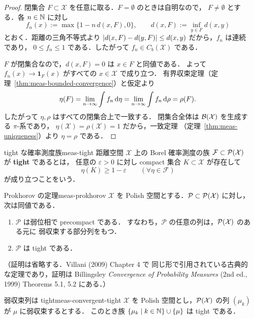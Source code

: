 \begin{proof}
  閉集合 $F\subset \mathcal{X}$ を任意に取る．$F=\emptyset$ のときは自明なので，
  $F\neq\emptyset$ とする．各 $n\in\mathbb{N}$ に対し
  \[
    f_n(x):=\max\{1-n\,d(x,F),0\},
    \qquad
    d(x,F):=\inf_{y\in F}d(x,y)
  \]
  とおく．距離の三角不等式より
  $\lvert d(x,F)-d(y,F) \rvert\leq d(x,y)$ だから，$f_n$ は連続であり，
  $0\leq f_n\leq1$ である．したがって $f_n\in C_b(\mathcal{X})$ である．

  $F$ が閉集合なので，$d(x,F)=0$ は $x\in F$ と同値である．
  よって $f_n(x)\to\mathbf{1}_F(x)$ がすべての $x\in \mathcal{X}$ で成り立つ．
  有界収束定理（定理~\ref{thm:meas-bounded-convergence}）と仮定より
  \[
    \eta(F)=\lim_{n\to\infty}\int f_n\,\mathrm{d}\eta
    =\lim_{n\to\infty}\int f_n\,\mathrm{d}\rho
    =\rho(F).
  \]
  したがって $\eta,\rho$ はすべての閉集合上で一致する．
  閉集合全体は $\mathcal{B}(\mathcal{X})$ を生成する $\pi$-系であり，
  $\eta(\mathcal{X})=\rho(\mathcal{X})=1$ だから，一致定理
  （定理~\ref{thm:meas-uniqueness}）より $\eta=\rho$ である．
\end{proof}

\begin{definition}{tight な確率測度族}{meas-tight}
  距離空間 $\mathcal{X}$ 上の Borel 確率測度の族
  $\mathcal{F}\subset\mathcal{P}(\mathcal{X})$ が \textbf{tight} であるとは，
  任意の $\varepsilon>0$ に対し compact 集合 $K\subset \mathcal{X}$ が存在して
  \[
    \eta(K)\geq 1-\varepsilon
    \qquad(\forall\eta\in\mathcal{F})
  \]
  が成り立つことをいう．
\end{definition}

\begin{theorem}{Prokhorov の定理}{meas-prokhorov}
  $\mathcal{X}$ を Polish 空間とする．$\mathcal{P}\subset\mathcal{P}(\mathcal{X})$ に対し，
  次は同値である．
  \begin{enumerate}
    \item $\mathcal{P}$ は弱位相で precompact である．
      すなわち，$\mathcal{P}$ の任意の列は，$\mathcal{P}(\mathcal{X})$ のある元に
      弱収束する部分列をもつ．
    \item $\mathcal{P}$ は tight である．
  \end{enumerate}
  （証明は省略する．Villani (2009) Chapter 4 で
  同じ形で引用されている古典的な定理であり，証明は
  Billingsley \emph{Convergence of Probability Measures}
  (2nd ed., 1999) Theorems 5.1, 5.2 にある．）
\end{theorem}

\begin{lemma}{弱収束列は tight}{meas-convergent-tight}
  $\mathcal{X}$ を Polish 空間とし，$\mathcal{P}(\mathcal{X})$ の列
  $(\mu_k)$ が $\mu$ に弱収束するとする．
  このとき族 $\{\mu_k\mid k\in\mathbb{N}\}\cup\{\mu\}$ は tight である．
\end{lemma}

